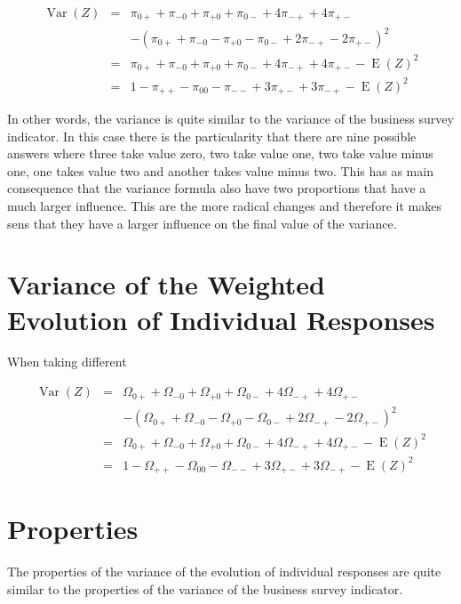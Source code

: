 \documentclass[12pt,a4paper,oneside]{book}
\DeclareMathOperator{\Var}{Var}
\DeclareMathOperator{\E}{E}
\begin{document}
\begin{eqnarray}
\Var(Z) &=& \pi_{0+} + \pi_{-0} + \pi_{+0} + \pi_{0-} +4\pi_{-+} +4\pi_{+-} \nonumber \\ 
&&    - (\pi_{0+} + \pi_{-0} - \pi_{+0} - \pi_{0-} +2\pi_{-+} -2\pi_{+-})^2  \\
&=& \pi_{0+} + \pi_{-0} + \pi_{+0} + \pi_{0-} +4\pi_{-+} +4\pi_{+-} - \E(Z)^2  \\
&=& 1 - \pi_{++} - \pi_{00} - \pi_{--} + 3\pi_{+-} + 3\pi_{-+} - \E(Z)^2
\end{eqnarray}

In other words, the variance is quite similar to the variance of the business survey indicator. In this case there is the particularity that there are nine possible answers where three take value zero, two take value one, two take value minus one, one takes value two and another takes value minus two. 
This has as main consequence that the variance formula also have two proportions that have a much larger influence. This are the more radical changes and therefore it makes sens that they have a larger influence on the final value of the variance.



\section{Variance of the Weighted Evolution of Individual Responses}

When taking different 


\begin{eqnarray}
\Var(Z) &=& \Omega_{0+} + \Omega_{-0} + \Omega_{+0} + \Omega_{0-} +4\Omega_{-+} +4\Omega_{+-} \nonumber \nonumber \\ 
&&    - (\Omega_{0+} + \Omega_{-0} - \Omega_{+0} - \Omega_{0-} +2\Omega_{-+} -2\Omega_{+-})^2  \\
&=& \Omega_{0+} + \Omega_{-0} + \Omega_{+0} + \Omega_{0-} +4\Omega_{-+} +4\Omega_{+-} - \E(Z)^2  \\
&=& 1 - \Omega_{++} - \Omega_{00} - \Omega_{--} + 3\Omega_{+-} + 3\Omega_{-+} - \E(Z)^2
\end{eqnarray}


\section{Properties}

The properties of the variance of the evolution of individual responses are quite similar to the properties of the variance of the business survey indicator.
\end{document}
